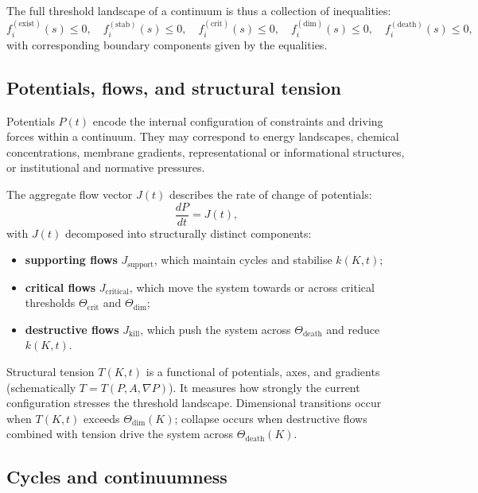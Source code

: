 The full threshold landscape of a continuum is thus a collection of inequalities:
\[
    f_{i}^{(\mathrm{exist})}(s) \le 0,\quad
    f_{i}^{(\mathrm{stab})}(s) \le 0,\quad
    f_{i}^{(\mathrm{crit})}(s) \le 0,\quad
    f_{i}^{(\mathrm{dim})}(s) \le 0,\quad
    f_{i}^{(\mathrm{death})}(s) \le 0,
\]
with corresponding boundary components given by the equalities.

\subsection{Potentials, flows, and structural tension}

Potentials \(P(t)\) encode the internal configuration of constraints and driving forces within a continuum.
They may correspond to energy landscapes, chemical concentrations, membrane gradients, representational or informational structures, or institutional and normative pressures.

The aggregate flow vector \(J(t)\) describes the rate of change of potentials:
\[
    \frac{dP}{dt} = J(t),
\]
with \(J(t)\) decomposed into structurally distinct components:
\begin{itemize}
    \item \textbf{supporting flows} \(J_{\mathrm{support}}\), which maintain cycles and stabilise \(k(K,t)\);
    \item \textbf{critical flows} \(J_{\mathrm{critical}}\), which move the system towards or across critical thresholds \(\Theta_{\mathrm{crit}}\) and \(\Theta_{\mathrm{dim}}\);
    \item \textbf{destructive flows} \(J_{\mathrm{kill}}\), which push the system across \(\Theta_{\mathrm{death}}\) and reduce \(k(K,t)\).
\end{itemize}

Structural tension \(T(K,t)\) is a functional of potentials, axes, and gradients (schematically \(T=T(P,A,\nabla P)\)).
It measures how strongly the current configuration stresses the threshold landscape.
Dimensional transitions occur when \(T(K,t)\) exceeds \(\Theta_{\mathrm{dim}}(K)\); collapse occurs when destructive flows combined with tension drive the system across \(\Theta_{\mathrm{death}}(K)\).

\subsection{Cycles and continuumness}

